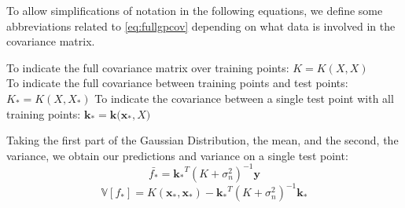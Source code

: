 To allow simplifications of notation in the following equations, we define some abbreviations related to \autoref{eq:fullgpcov} depending on what data is involved in the covariance matrix. 
 
 To indicate the full covariance matrix over training points: $K = K(X, X)$ \\
 To indicate the full covariance between training points and test points: $K_* = K(X, X_*)$
 To indicate the covariance between a single test point with all training points: $\mathbf{k_*} = \mathbf{k(x_*}, X)$
 
% 
Taking the first part of the Gaussian Distribution, the mean, and the second, the variance, we obtain our predictions and variance on a single test point:
\begin{equation}
    \bar{f_*} = \mathbf{k_*}^T(K+\sigma_n^2)^{-1} \mathbf{y}
\end{equation}
\begin{equation}
    \mathbb{V}[f_*] = K(\mathbf{x_*},\mathbf{x_*}) - \mathbf{k_*}^T (K+\sigma^2_n)^{-1}\mathbf{k_*}
\end{equation}
% 

